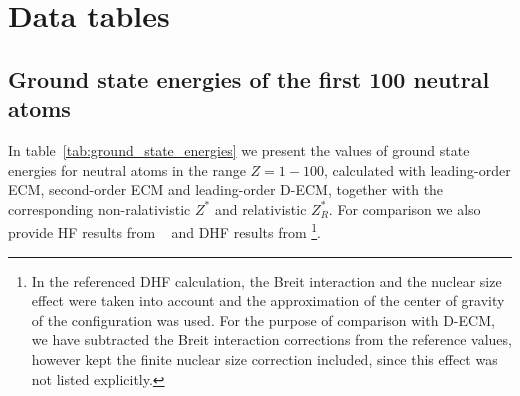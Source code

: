 \chapter{Data tables}


\section{Ground state energies of the first 100 neutral atoms}
\label{app:GroundStates}
  
  In table~\ref{tab:ground_state_energies} we present the values of ground state energies for neutral atoms in the range $Z=1-100$, calculated with leading-order ECM, second-order ECM and leading-order D-ECM, together with the corresponding non-ralativistic $Z^*$ and relativistic $Z_R^*$. For comparison we also provide HF results from ~\cite{Saito2009836} and DHF results from \cite{DESCLAUX1973311} \footnote{In the referenced DHF calculation, the Breit interaction and the nuclear size effect were taken into account and the approximation of the center of gravity of the configuration was used. For the purpose of comparison with D-ECM, we have subtracted the Breit interaction corrections from the reference values, however kept the finite nuclear size correction included, since this effect was not listed explicitly.}.
     
